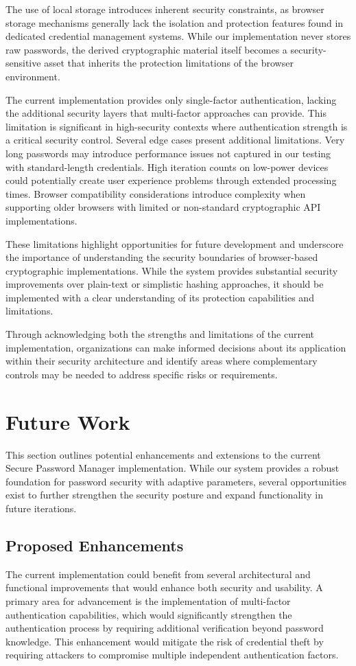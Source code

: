 \documentclass[11pt,a4paper]{article}
\begin{document}
The use of local storage introduces inherent security constraints, as browser storage mechanisms generally lack the isolation and protection features found in dedicated credential management systems. While our implementation never stores raw passwords, the derived cryptographic material itself becomes a security-sensitive asset that inherits the protection limitations of the browser environment.

The current implementation provides only single-factor authentication, lacking the additional security layers that multi-factor approaches can provide. This limitation is significant in high-security contexts where authentication strength is a critical security control.
Several edge cases present additional limitations. Very long passwords may introduce performance issues not captured in our testing with standard-length credentials. High iteration counts on low-power devices could potentially create user experience problems through extended processing times. Browser compatibility considerations introduce complexity when supporting older browsers with limited or non-standard cryptographic API implementations.

These limitations highlight opportunities for future development and underscore the importance of understanding the security boundaries of browser-based cryptographic implementations. While the system provides substantial security improvements over plain-text or simplistic hashing approaches, it should be implemented with a clear understanding of its protection capabilities and limitations.

Through acknowledging both the strengths and limitations of the current implementation, organizations can make informed decisions about its application within their security architecture and identify areas where complementary controls may be needed to address specific risks or requirements.

\section{Future Work}
This section outlines potential enhancements and extensions to the current Secure Password Manager implementation. While our system provides a robust foundation for password security with adaptive parameters, several opportunities exist to further strengthen the security posture and expand functionality in future iterations.
\subsection{Proposed Enhancements}
The current implementation could benefit from several architectural and functional improvements that would enhance both security and usability. A primary area for advancement is the implementation of multi-factor authentication capabilities, which would significantly strengthen the authentication process by requiring additional verification beyond password knowledge. This enhancement would mitigate the risk of credential theft by requiring attackers to compromise multiple independent authentication factors.
\end{document}

